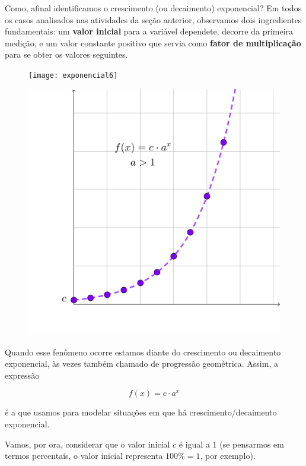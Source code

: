 Como, afinal identificamos o crescimento (ou decaimento) exponencial? Em todos os casos analisados nas atividades da seção anterior, observamos dois ingredientes fundamentais: um \textbf{valor inicial} para a variável dependete, decorre da primeira medição, e um valor constante positivo que servia como \textbf{fator de multiplicação} para se obter os valores seguintes.

\begin{figure}[H]
\centering
\texttt{[image: exponencial6]}

\end{figure}


\begin{figure}

\centering

\includegraphics[width=.4\textwidth]{Figuras/exponencial7.png}

\end{figure}

Quando esse fenômeno ocorre estamos diante do crescimento ou decaimento exponencial, às vezes também chamado de progressão geométrica. Assim, a expressão

\begin{equation*}
f(x)=c\cdot a^x
\end{equation*}

é a que usamos para modelar situações em que há crescimento/decaimento exponencial.

Vamos, por ora, considerar que o valor inicial $c$ é igual a $1$ (se pensarmos em termos percentais, o valor inicial representa $100\%=1$, por exemplo). 


